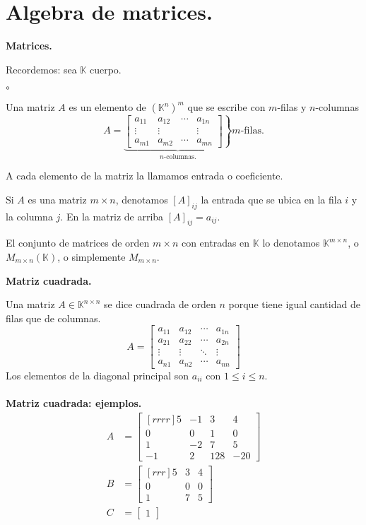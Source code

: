 \documentclass{article}
\theoremstyle{definition}
\theoremstyle{definition}
\theoremstyle{remark}
\begin{document}
\section{Algebra de matrices.}
\begin{center}
\textbf{Matrices.}
\end{center}
Recordemos: sea $\mathbb{K}$ cuerpo. 
\begin{list}{$\circ$}{}  
\item  Una matriz $A$ es un elemento de $(\mathbb{K}^n)^m$ que se escribe con $m$-filas y $n$-columnas \[
    A= \underbrace{\left.\begin{bmatrix} a_{11} & a_{12} & \cdots & a_{1n} \\
      \vdots & \vdots & & \vdots \\
      a_{m1} & a_{m2} & \cdots & a_{mn}
\end{bmatrix}\right\}}_{n\text{-columnas.}} m\text{-filas.}   \]
\item A cada elemento de la matriz la llamamos entrada o coeficiente. 
  \item Si $A$ es una matriz $ m \times n$, denotamos $[A]_{ij}$ la entrada que se ubica en la fila $i$ y la columna $j$. En la matriz de arriba $[A]_{ij}=a_{ij}$.
  \item El conjunto de matrices de orden $m \times n$ con entradas en $\mathbb{K}$ lo denotamos $\mathbb{K}^{m \times n}$, o $M_{m \times n}(\mathbb{K})$, o simplemente $M_{m \times n}$.
\end{list}
\begin{center}
\textbf{Matriz cuadrada.}
\end{center}
Una matriz $A \in \mathbb{K}^{n \times n}$ se dice cuadrada de orden $n$ porque tiene igual cantidad de filas que de columnas.
\[
  A=\begin{bmatrix} 
    a_{11} & a_{12} & \cdots & a_{1n} \\
  a_{21} & a_{22} & \cdots & a_{2n} \\
  \vdots & \vdots & \ddots & \vdots \\
  a_{n1} & a_{n2} & \cdots & a_{nn}
  \end{bmatrix}
\]
Los elementos de la diagonal principal son $a_{ii}$ con $1 \leq i \leq n$.\\\\
\textbf{Matriz cuadrada: ejemplos.}
\[\begin{aligned}
  A&=\begin{bmatrix}[rrrr] 5 & -1 & 3 & 4 \\ 0 & 0 & 1 & 0 \\ 1 & -2 & 7 & 5 \\ -1 & 2 & 128 & -20 \end{bmatrix}\\
  B&= \begin{bmatrix}[rrr] 5 & 3 & 4 \\ 0 & 0 & 0 \\ 1 & 7 & 5 \end{bmatrix} \\
  C&= \begin{bmatrix} 1 \end{bmatrix}
\end{aligned}
\]
\pagebreak
\end{document}
